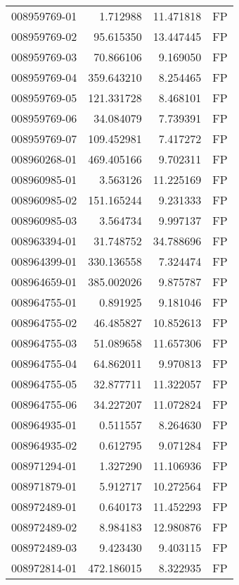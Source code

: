 \begin{tabular}{lrrl}
008959769-01 &    1.712988 &      11.471818 &   FP \\
008959769-02 &   95.615350 &      13.447445 &   FP \\
008959769-03 &   70.866106 &       9.169050 &   FP \\
008959769-04 &  359.643210 &       8.254465 &   FP \\
008959769-05 &  121.331728 &       8.468101 &   FP \\
008959769-06 &   34.084079 &       7.739391 &   FP \\
008959769-07 &  109.452981 &       7.417272 &   FP \\
008960268-01 &  469.405166 &       9.702311 &   FP \\
008960985-01 &    3.563126 &      11.225169 &   FP \\
008960985-02 &  151.165244 &       9.231333 &   FP \\
008960985-03 &    3.564734 &       9.997137 &   FP \\
008963394-01 &   31.748752 &      34.788696 &   FP \\
008964399-01 &  330.136558 &       7.324474 &   FP \\
008964659-01 &  385.002026 &       9.875787 &   FP \\
008964755-01 &    0.891925 &       9.181046 &   FP \\
008964755-02 &   46.485827 &      10.852613 &   FP \\
008964755-03 &   51.089658 &      11.657306 &   FP \\
008964755-04 &   64.862011 &       9.970813 &   FP \\
008964755-05 &   32.877711 &      11.322057 &   FP \\
008964755-06 &   34.227207 &      11.072824 &   FP \\
008964935-01 &    0.511557 &       8.264630 &   FP \\
008964935-02 &    0.612795 &       9.071284 &   FP \\
008971294-01 &    1.327290 &      11.106936 &   FP \\
008971879-01 &    5.912717 &      10.272564 &   FP \\
008972489-01 &    0.640173 &      11.452293 &   FP \\
008972489-02 &    8.984183 &      12.980876 &   FP \\
008972489-03 &    9.423430 &       9.403115 &   FP \\
008972814-01 &  472.186015 &       8.322935 &   FP \\

\end{tabular}
